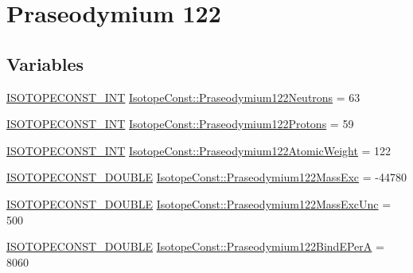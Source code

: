 \hypertarget{group___isotope_const-_praseodymium-_pr122}{}\section{Praseodymium 122}
\label{group___isotope_const-_praseodymium-_pr122}
\subsection*{Variables}
\begin{DoxyCompactItemize}
\item 
\mbox{\hyperlink{group___isotope_const-_macros_ga5f18360b3e99483a35c32d789e62621c}{I\+S\+O\+T\+O\+P\+E\+C\+O\+N\+S\+T\+\_\+\+I\+NT}} \mbox{\hyperlink{group___isotope_const-_praseodymium-_pr122_ga147f12991d2c270dca4d8aac8b0a1ce3}{Isotope\+Const\+::\+Praseodymium122\+Neutrons}} = 63
\item 
\mbox{\hyperlink{group___isotope_const-_macros_ga5f18360b3e99483a35c32d789e62621c}{I\+S\+O\+T\+O\+P\+E\+C\+O\+N\+S\+T\+\_\+\+I\+NT}} \mbox{\hyperlink{group___isotope_const-_praseodymium-_pr122_ga598e189ec137fff70520197938fc6e02}{Isotope\+Const\+::\+Praseodymium122\+Protons}} = 59
\item 
\mbox{\hyperlink{group___isotope_const-_macros_ga5f18360b3e99483a35c32d789e62621c}{I\+S\+O\+T\+O\+P\+E\+C\+O\+N\+S\+T\+\_\+\+I\+NT}} \mbox{\hyperlink{group___isotope_const-_praseodymium-_pr122_gad7fae3d78bbb6f8effd72b1a90a2cf42}{Isotope\+Const\+::\+Praseodymium122\+Atomic\+Weight}} = 122
\item 
\mbox{\hyperlink{group___isotope_const-_macros_ga8f45a7272ce02c0b4c65c44636ed719a}{I\+S\+O\+T\+O\+P\+E\+C\+O\+N\+S\+T\+\_\+\+D\+O\+U\+B\+LE}} \mbox{\hyperlink{group___isotope_const-_praseodymium-_pr122_ga09ff9b33aa75c127eed0ec38f1dba43f}{Isotope\+Const\+::\+Praseodymium122\+Mass\+Exc}} = -\/44780
\item 
\mbox{\hyperlink{group___isotope_const-_macros_ga8f45a7272ce02c0b4c65c44636ed719a}{I\+S\+O\+T\+O\+P\+E\+C\+O\+N\+S\+T\+\_\+\+D\+O\+U\+B\+LE}} \mbox{\hyperlink{group___isotope_const-_praseodymium-_pr122_ga6f313cb7f060a4c050f80ffabbf68358}{Isotope\+Const\+::\+Praseodymium122\+Mass\+Exc\+Unc}} = 500
\item 
\mbox{\hyperlink{group___isotope_const-_macros_ga8f45a7272ce02c0b4c65c44636ed719a}{I\+S\+O\+T\+O\+P\+E\+C\+O\+N\+S\+T\+\_\+\+D\+O\+U\+B\+LE}} \mbox{\hyperlink{group___isotope_const-_praseodymium-_pr122_ga3b9e78b654ba567fa6581c11b864c3f2}{Isotope\+Const\+::\+Praseodymium122\+Bind\+E\+PerA}} = 8060

\end{DoxyCompactItemize}

